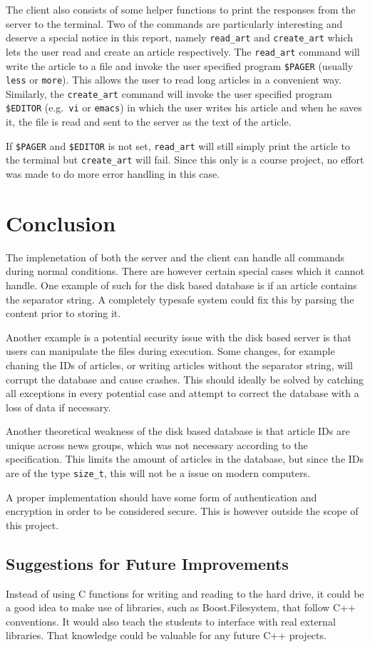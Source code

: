 \documentclass{acmsiggraph}               %
\begin{document}
The client also consists of some helper functions to print the responses from
the server to the terminal. Two of the commands are particularly interesting
and deserve a special notice in this report, namely \verb|read_art| and
\verb|create_art| which lets the user read and create an article respectively.
The \verb|read_art| command will write the article to a file and invoke the
user specified program \verb|$PAGER| (usually \verb|less| or \verb|more|). This
allows the user to read long articles in a convenient way. Similarly, the
\verb|create_art| command will invoke the user specified program \verb|$EDITOR|
(e.g.\ \verb|vi| or \verb|emacs|) in which the user writes his article and when
he saves it, the file is read and sent to the server as the text of the
article.

If \verb|$PAGER| and \verb|$EDITOR| is not set, \verb|read_art| will still
simply print the article to the terminal but \verb|create_art| will fail. Since
this only is a course project, no effort was made to do more error handling in
this case.

\section{Conclusion}
\label{sec:concl}
The implenetation of both the server and the client can handle all commands during
normal conditions. There are however certain special cases which it cannot handle. One
example of such for the disk based database is if an article contains the separator
string. A completely typesafe system could fix this by parsing the content prior to
storing it. 

Another example is a potential security issue with the disk based server
is that users can manipulate the files during execution. Some changes, for example 
chaning the IDs of articles, or writing articles without the separator string, will
corrupt the database and cause crashes. This should ideally be solved by catching
all exceptions in every potential case and attempt to correct the database with a
loss of data if necessary. 

Another theoretical weakness of the disk based database is that article IDs are unique
across news groups, which was not necessary according to the specification. This
limits the amount of articles in the database, but since the IDs are of
the type \texttt{size\_t}, this will not be a issue on modern computers.

A proper implementation should have some form of authentication and encryption 
in order to be considered secure. This is however outside the scope of this project.

\subsection{Suggestions for Future Improvements}
Instead of using C functions for writing and reading to the hard drive, it could
be a good idea to make use of libraries, such as Boost.Filesystem, that follow C++ 
conventions. It would also teach the students to interface with real external libraries. 
That knowledge could be valuable for any future C++ projects.
\end{document}
